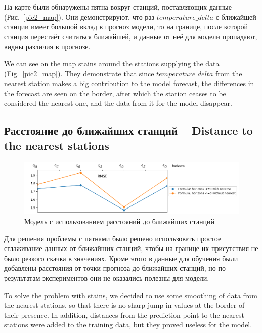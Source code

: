\documentclass[14pt]{matmex-diploma}
\begin{document}
На карте были обнаружены пятна вокруг станций, поставляющих данные (Рис.~\ref{pic2_map}). Они демонстрируют, что раз $temperature\_delta$ с ближайшей станции имеет большой вклад в прогноз модели, то на границе, после которой станция перестаёт считаться ближайшей, и данные от неё для модели пропадают, видны различия в прогнозе.


We can see on the map stains around the stations supplying the data (Fig.~\ref{pic2_map}). They demonstrate that since $temperature\_delta$ from the nearest station makes a big contribution to the model forecast, the differences in the forecast are seen on the border, after which the station ceases to be considered the nearest one, and the data from it for the model disappear.


\subsection{Расстояние до ближайших станций -- Distance to the nearest stations}

\begin{figure}
\centering
\includegraphics[width=\linewidth]{images/pic3_metrics_final.png}
\caption{Модель с использованием расстояний до ближайших станций}
\label{pic3_metrics_final}
\end{figure}

Для решения проблемы с пятнами было решено использовать простое сглаживание данных от ближайших станций, чтобы на границе их присутствия не было резкого скачка в значениях. Кроме этого в данные для обучения были добавлены расстояния от точки прогноза до ближайших станций, но по результатам экспериментов они не оказались полезны для модели.

To solve the problem with stains, we decided to use some smoothing of data from the nearest stations, so that there is no sharp jump in values at the border of their presence. In addition, distances from the prediction point to the nearest stations were added to the training data, but they proved useless for the model.
\end{document}
